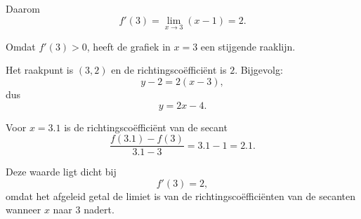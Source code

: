 \documentclass{ximera}
\begin{document}
\begin{oefening}{\oefU\ESS}
\begin{oplossing}
Daarom
\[
f'(3)
=
\lim_{x\to3}(x-1)
=
\boxed{2}.
\]

Omdat $f'(3)>0$, heeft de grafiek in $x=3$ een stijgende raaklijn.

Het raakpunt is $(3,2)$ en de richtingscoëfficiënt is $2$. Bijgevolg:
\[
y-2=2(x-3),
\]
dus
\[
\boxed{y=2x-4}.
\]

Voor $x=3.1$ is de richtingscoëfficiënt van de secant
\[
\frac{f(3.1)-f(3)}{3.1-3}
=
3.1-1
=
2.1.
\]

Deze waarde ligt dicht bij
\[
f'(3)=2,
\]
omdat het afgeleid getal de limiet is van de richtingscoëfficiënten van
de secanten wanneer $x$ naar $3$ nadert.

\end{oplossing}

\end{oefening}


\FVDendExercises
\end{document}

